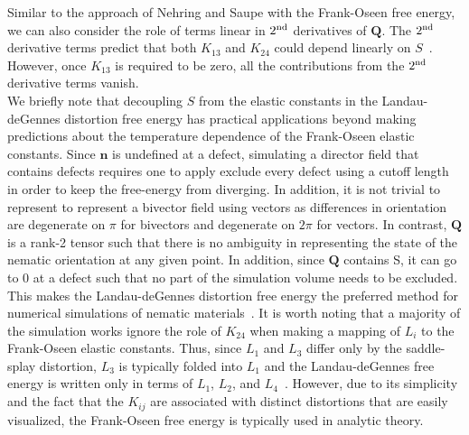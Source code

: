 Similar to the approach of Nehring and Saupe with the Frank-Oseen free energy, we can also consider the role of terms linear in $2^{\rm nd}$ derivatives of $\mathbf{Q}$.
The $2^{\rm nd}$ derivative terms predict that both $K_{13}$ and $K_{24}$ could depend linearly on $S$~\cite{RN58}.
However, once $K_{13}$ is required to be zero, all the contributions from the $2^{\rm nd}$ derivative terms vanish.\\


We briefly note that decoupling $S$ from the elastic constants in the Landau-deGennes distortion free energy has practical applications beyond making predictions about the temperature dependence of the Frank-Oseen elastic constants.
Since $\mathbf{n}$ is undefined at a defect, simulating a director field that contains defects requires one to apply exclude every defect using a cutoff length in order to keep the free-energy from diverging.
In addition, it is not trivial to represent to represent a bivector field using vectors as differences in orientation are degenerate on $\pi$ for bivectors and degenerate on $2\pi$ for vectors.
In contrast, $\mathbf{Q}$ is a rank-2 tensor such that there is no ambiguity in representing the state of the nematic orientation at any given point.
In addition, since $\mathbf{Q}$ contains S, it can go to 0 at a defect such that no part of the simulation volume needs to be excluded.
This makes the Landau-deGennes distortion free energy the preferred method for numerical simulations of nematic materials~\cite{RN190}.
It is worth noting that a majority of the simulation works ignore the role of $K_{24}$ when making a mapping of $L_i$ to the Frank-Oseen elastic constants.
Thus, since $L_1$ and $L_3$ differ only by the saddle-splay distortion, $L_3$ is typically folded into $L_1$ and the Landau-deGennes free energy is written only in terms of $L_1$, $L_2$, and $L_4$~\cite{RN198,RN190}.
However, due to its simplicity and the fact that the $K_{ij}$ are associated with distinct distortions that are easily visualized, the Frank-Oseen free energy is typically used in analytic theory.\\


